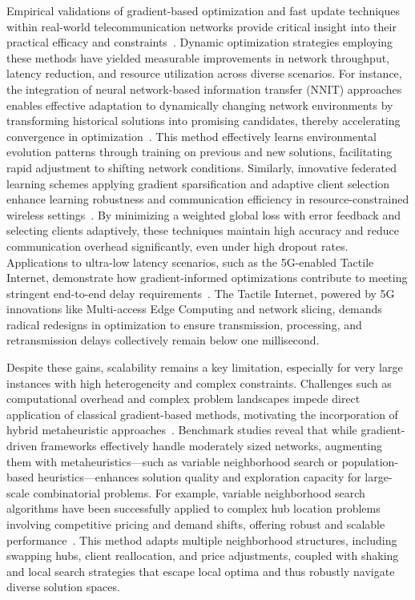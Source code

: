 \documentclass[sigconf]{acmart}
\begin{document}
Empirical validations of gradient-based optimization and fast update techniques within real-world telecommunication networks provide critical insight into their practical efficacy and constraints~\cite{ref1,ref4,ref10,ref37,ref47}. Dynamic optimization strategies employing these methods have yielded measurable improvements in network throughput, latency reduction, and resource utilization across diverse scenarios. For instance, the integration of neural network-based information transfer (NNIT) approaches enables effective adaptation to dynamically changing network environments by transforming historical solutions into promising candidates, thereby accelerating convergence in optimization~\cite{ref47}. This method effectively learns environmental evolution patterns through training on previous and new solutions, facilitating rapid adjustment to shifting network conditions. Similarly, innovative federated learning schemes applying gradient sparsification and adaptive client selection enhance learning robustness and communication efficiency in resource-constrained wireless settings~\cite{ref4}. By minimizing a weighted global loss with error feedback and selecting clients adaptively, these techniques maintain high accuracy and reduce communication overhead significantly, even under high dropout rates. Applications to ultra-low latency scenarios, such as the 5G-enabled Tactile Internet, demonstrate how gradient-informed optimizations contribute to meeting stringent end-to-end delay requirements~\cite{ref10}. The Tactile Internet, powered by 5G innovations like Multi-access Edge Computing and network slicing, demands radical redesigns in optimization to ensure transmission, processing, and retransmission delays collectively remain below one millisecond.

Despite these gains, scalability remains a key limitation, especially for very large instances with high heterogeneity and complex constraints. Challenges such as computational overhead and complex problem landscapes impede direct application of classical gradient-based methods, motivating the incorporation of hybrid metaheuristic approaches~\cite{ref37}. Benchmark studies reveal that while gradient-driven frameworks effectively handle moderately sized networks, augmenting them with metaheuristics—such as variable neighborhood search or population-based heuristics—enhances solution quality and exploration capacity for large-scale combinatorial problems. For example, variable neighborhood search algorithms have been successfully applied to complex hub location problems involving competitive pricing and demand shifts, offering robust and scalable performance~\cite{ref37}. This method adapts multiple neighborhood structures, including swapping hubs, client reallocation, and price adjustments, coupled with shaking and local search strategies that escape local optima and thus robustly navigate diverse solution spaces.
\end{document}

